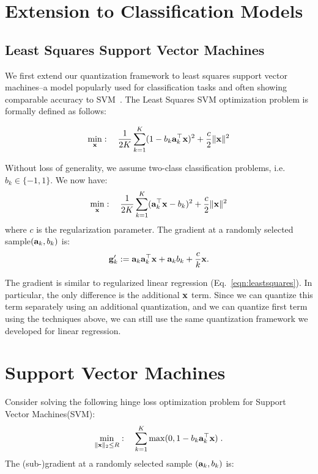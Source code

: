 \documentclass{article}
\def\a{{\bf a}}
\def\g{{\bf g}}
\def\x{{\bf x}}
\begin{document}
\section{Extension to Classification Models}

\subsection{Least Squares Support Vector Machines}

We first extend our quantization framework to 
least squares support vector machines--a model
popularly used for classification tasks and
often showing comparable accuracy to
SVM~\cite{SvmVsLssvm}.
The  Least Squares SVM optimization problem is formally defined as follows: 

\begin{align*}
\min_{\x}:\quad {1\over 2K}\sum_{k=1}^K (1-b_k\a_k^\top \x)^2 + {c\over 2}\|\x\|^2
\end{align*}

\noindent Without
loss of generality, we assume two-class classification problems, i.e.  $b_k \in \{-1, 1\}$.
We now have:
\begin{align*}
\min_{\x}:\quad {1\over 2K}\sum_{k=1}^K (\a_k^\top \x - b_k)^2 + {c\over 2}\|\x\|^2
\end{align*}
where $c$ is the regularization parameter. The gradient at a randomly selected sample$(\a_k, b_k)$ is: 
\[
\g'_k := \a_k \a_k^\top \x + \a_k b_k + {c\over k} \x.
\]

The gradient is similar to regularized linear regression (Eq.~\ref{eqn:leastsquares}). 
In particular, the only difference is the additional $\x$ term.
Since we can quantize this term separately using an additional quantization, and we can quantize first term using the techniques above, we can still use 
the same quantization framework we developed
for linear regression.

\section{Support Vector Machines}

Consider solving the following hinge loss optimization problem for Support Vector Machines(SVM):
\begin{align*}
\min_{\| \x \|_2 \leq R}:\quad \sum_{k=1}^K \max(0, 1 - b_k \a_k^\top \x) \; .
\end{align*}
The (sub-)gradient at a randomly selected sample $(\a_k, b_k)$ is: 
\end{document}
